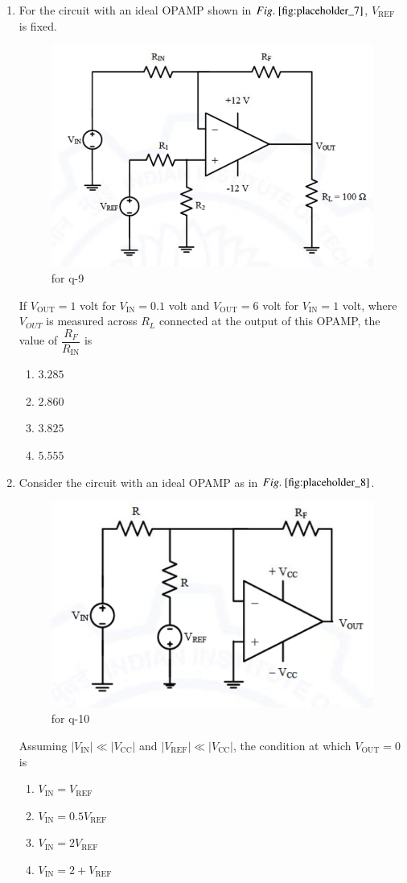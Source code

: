 \documentclass[journal,12pt,onecolumn]{IEEEtran}
\theoremstyle{remark}
\begin{document}
\begin{enumerate}
\item For the circuit with an ideal OPAMP shown in $\figref{fig:placeholder_7}$, $V_{\text{REF}}$ is fixed.  
\begin{figure}[H]
    \centering
    \includegraphics[width=0.4\columnwidth]{figs/7.png}
    \caption{\centering for q-9}
    \label{fig:placeholder_7}
\end{figure}
If $V_{\text{OUT}} = 1$ volt for $V_{\text{IN}} = 0.1$ volt and $V_{\text{OUT}} = 6$ volt for $V_{\text{IN}} = 1$ volt, where $V_{OUT}$ is measured across $R_L$ connected at the output of this OPAMP, the value of $\dfrac{R_F}{R_{\text{IN}}}$ is
\begin{multicols}{4}
\begin{enumerate}
\item $3.285$
\item $2.860$
\item $3.825$
\item $5.555$
\end{enumerate}
\end{multicols}
\hfill {}

\item Consider the circuit with an ideal OPAMP as in $\figref{fig:placeholder_8}$. 
\begin{figure}[H]
    \centering
    \includegraphics[width=0.4\columnwidth]{figs/8.png}
    \caption{\centering for q-10}
    \label{fig:placeholder_8}
\end{figure}

Assuming ${|V_{\text{IN}}| \ll |V_{\text{CC}}|}$ and ${|V_{\text{REF}}| \ll |V_{\text{CC}}|}$, the condition at which $V_{\text{OUT}} = 0$ is
\begin{multicols}{4}
\begin{enumerate}
\item $V_{\text{IN}} = V_{\text{REF}}$
\item $V_{\text{IN}} = 0.5 V_{\text{REF}}$
\item $V_{\text{IN}} = 2 V_{\text{REF}}$
\item $V_{\text{IN}} = 2 + V_{\text{REF}}$
\end{enumerate}
\end{multicols}
\hfill {}


\end{enumerate}
\end{document}

